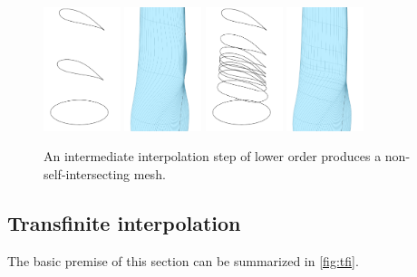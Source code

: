 \documentclass[3p,times,procedia]{elsarticle}
\begin{document}
\begin{figure}
  \centering
  \includegraphics[width=0.2\textwidth]{figs/length-none}
  \includegraphics[width=0.2\textwidth]{figs/length-none-surf}
  \includegraphics[width=0.2\textwidth]{figs/length-joined}
  \includegraphics[width=0.2\textwidth]{figs/length-joined-surf}
  \caption{An intermediate interpolation step of lower order produces a
    non-self-intersecting mesh.}
  \label{fig:length-joined}
\end{figure}

\subsection{Transfinite interpolation}
\label{sec:tfi}

The basic premise of this section can be summarized in \autoref{fig:tfi}.
\end{document}
